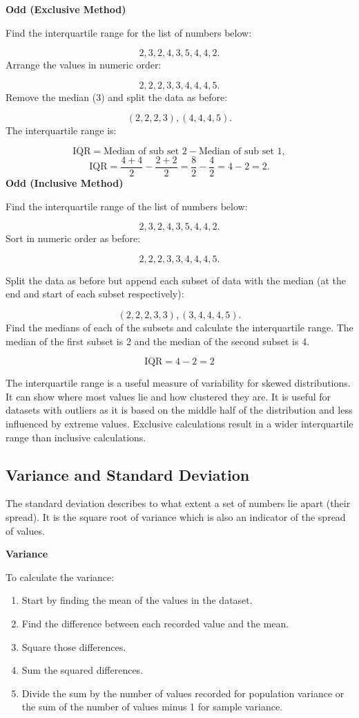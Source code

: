 \documentclass[
]{book}
\providecommand{\tightlist}{%
  \setlength{\itemsep}{0pt}\setlength{\parskip}{0pt}}
\begin{document}
\textbf{Odd (Exclusive Method)}

Find the interquartile range for the list of numbers below:

\[2, 3, 2, 4, 3, 5, 4, 4, 2.\]
Arrange the values in numeric order:

\[2, 2, 2, 3, 3, 4, 4, 4, 5. \]
Remove the median (3) and split the data as before:

\[ (2, 2, 2, 3), (4, 4, 4, 5).\]
The interquartile range is:

\[ \textrm{IQR}=\textrm{Median of sub set 2}- \textrm{Median of sub set 1},\]
\[ \textrm{IQR}=\frac{4+4}{2} - \frac{2+2}{2}=\frac{8}{2} - \frac{4}{2} = 4 - 2= 2.\]
\textbf{Odd (Inclusive Method)}

Find the interquartile range of the list of numbers below:

\[ 2, 3, 2, 4, 3, 5, 4, 4, 2.\]
Sort in numeric order as before:

\[2, 2, 2, 3, 3, 4, 4, 4, 5.\]

Split the data as before but append each subset of data with the median (at the end and start of each subset respectively):

\[(2, 2, 2, 3, 3),(3, 4, 4, 4, 5).\]
Find the medians of each of the subsets and calculate the interquartile range. The median of the first subset is 2 and the median of the second subset is 4.

\[ \textrm{IQR} = 4 - 2 = 2 \]

The interquartile range is a useful measure of variability for skewed distributions. It can show where most values lie and how clustered they are. It is useful for datasets with outliers as it is based on the middle half of the distribution and less influenced by extreme values. Exclusive calculations result in a wider interquartile range than inclusive calculations.

\hypertarget{variance-and-standard-deviation}{%
\subsection{Variance and Standard Deviation}\label{variance-and-standard-deviation}}

The standard deviation describes to what extent a set of numbers lie apart (their spread). It is the square root of variance which is also an indicator of the spread of values.

\textbf{Variance}

To calculate the variance:

\begin{enumerate}
\def\labelenumi{\arabic{enumi}.}
\tightlist
\item
  Start by finding the mean of the values in the dataset.
\item
  Find the difference between each recorded value and the mean.
\item
  Square those differences.
\item
  Sum the squared differences.
\item
  Divide the sum by the number of values recorded for population variance or the sum of the number of values minus 1 for sample variance.
\end{enumerate}
\end{document}
